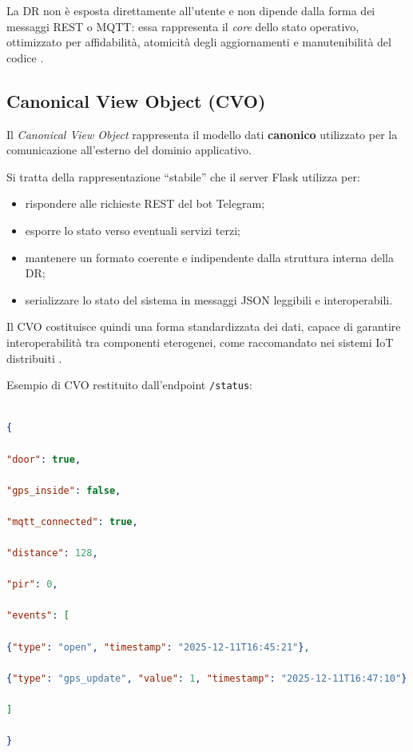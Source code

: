 La DR non è esposta direttamente all’utente e non dipende dalla forma dei messaggi REST o MQTT: essa rappresenta il \textit{core} dello stato operativo, ottimizzato per affidabilità, atomicità degli aggiornamenti e manutenibilità del codice \cite{Pressman2019}.


\subsection{Canonical View Object (CVO)}


Il \textit{Canonical View Object} rappresenta il modello dati \textbf{canonico} utilizzato per la comunicazione all’esterno del dominio applicativo.

Si tratta della rappresentazione “stabile” che il server Flask utilizza per:


\begin{itemize}

\item rispondere alle richieste REST del bot Telegram;

\item esporre lo stato verso eventuali servizi terzi;

\item mantenere un formato coerente e indipendente dalla struttura interna della DR;

\item serializzare lo stato del sistema in messaggi JSON leggibili e interoperabili.

\end{itemize}


Il CVO costituisce quindi una forma standardizzata dei dati, capace di garantire interoperabilità tra componenti eterogenei, come raccomandato nei sistemi IoT distribuiti \cite{Guinard2016}.


Esempio di CVO restituito dall’endpoint \texttt{/status}:


\begin{lstlisting}[language=json, caption={Esempio di Canonical View Object esposto dal server Flask}]

{

"door": true,

"gps_inside": false,

"mqtt_connected": true,

"distance": 128,

"pir": 0,

"events": [

{"type": "open", "timestamp": "2025-12-11T16:45:21"},

{"type": "gps_update", "value": 1, "timestamp": "2025-12-11T16:47:10"}

]

}

\end{lstlisting}


